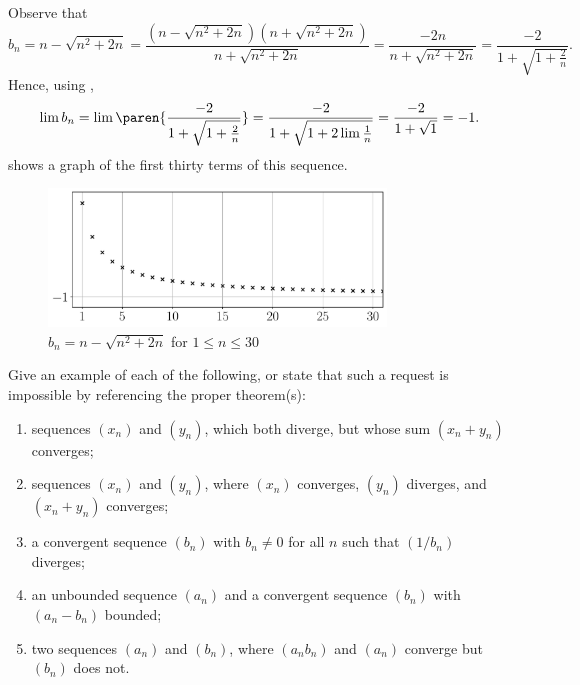 \documentclass{lew98_solutions}
\begin{document}
\begin{solution}
    Observe that
    \[
        b_n = n - \sqrt{n^2 + 2n} = \frac{(n - \sqrt{n^2 + 2n})(n + \sqrt{n^2 + 2n})}{n + \sqrt{n^2 + 2n}} = \frac{-2n}{n + \sqrt{n^2 + 2n}} = \frac{-2}{1 + \sqrt{1 + \tfrac{2}{n}}}.
    \]
    Hence, using ,
    \[
        \lim b_n = \lim \paren{ \frac{-2}{1 + \sqrt{1 + \tfrac{2}{n}}} } = \frac{-2}{1 + \sqrt{1 + 2 \lim \tfrac{1}{n} }} = \frac{-2}{1 + \sqrt{1}} = -1.
    \]
     shows a graph of the first thirty terms of this sequence.
    \begin{figure}
        \centering
        \includegraphics[width=0.8\textwidth]{UA_Figures/UA_ex2_3_6_fig.pdf}
        \caption{\( b_n = n - \sqrt{n^2 + 2n} \) for \( 1 \leq n \leq 30 \)}
        \label{fig:ex2.3.6}
    \end{figure}
\end{solution}

\begin{exercise}
\label{ex:2.3.7}
    Give an example of each of the following, or state that such a request is impossible by referencing the proper theorem(s):
    \begin{enumerate}
        \item sequences \( (x_n) \) and \( (y_n) \), which both diverge, but whose sum \( (x_n + y_n) \) converges;

        \item sequences \( (x_n) \) and \( (y_n) \), where \( (x_n) \) converges, \( (y_n) \) diverges, and \( (x_n + y_n) \) converges;

        \item a convergent sequence \( (b_n) \) with \( b_n \neq 0 \) for all \( n \) such that \( (1/b_n) \) diverges;

        \item an unbounded sequence \( (a_n) \) and a convergent sequence \( (b_n) \) with \( (a_n - b_n) \) bounded;

        \item two sequences \( (a_n) \) and \( (b_n) \), where \( (a_n b_n) \) and \( (a_n) \) converge but \( (b_n) \) does not.
    \end{enumerate}
\end{exercise}
\end{document}
